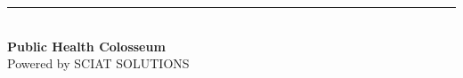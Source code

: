 \documentclass[11pt,a4paper]{report}
\begin{document}
\vspace{2cm}
\begin{center}
\textcolor{phcDim}{\rule{0.4\textwidth}{0.4pt}}\\[8pt]
\textbf{Public Health Colosseum}\\[2pt]
\textcolor{phcDim}{Powered by SCIAT SOLUTIONS}
\end{center}
\end{document}
